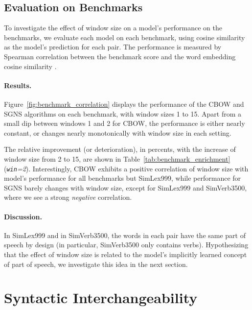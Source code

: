 \documentclass[11pt,a4paper]{article}
\begin{document}
    \subsection{Evaluation on Benchmarks}\label{sec:eval_exp}
    
    To investigate the effect of window size on a model's performance on the benchmarks,
    we evaluate each model on each benchmark, using cosine similarity
    as the model's prediction for each pair.
    The performance is measured by Spearman correlation between the benchmark score
    and the word embedding cosine similarity \cite{levy2015improving}.
    
    \paragraph{Results.}
    
    Figure~\ref{fig:benchmark_correlation} displays the performance of the CBOW and SGNS
    algorithms on each benchmark, with window sizes 1 to 15.
    Apart from a small dip between windows 1 and 2 for
    CBOW,
    the performance is either nearly constant,
    or changes nearly monotonically with window size in each setting.
    
    The relative improvement (or deterioration),
    in percents, with the increase of window size from 2 to 15,
    are shown in Table~\ref{tab:benchmark_enrichment} (\textit{\Delta \texttt{win}=2}).
    Interestingly, CBOW exhibits a positive correlation of window size with model's performance
    for all benchmarks but SimLex999,
    while performance for SGNS barely changes with window size,
    except for SimLex999 and SimVerb3500, where we see a strong \textit{negative} correlation.
    
    \paragraph{Discussion.}
    
    In SimLex999 and in SimVerb3500, the words in each pair have the same part of speech by design
    (in particular, SimVerb3500 only contains verbs).
    Hypothesizing that the effect of window size is related to the model's
    implicitly learned concept of part of speech, we investigate this idea in the next section.
    
    
    \section{Syntactic Interchangeability}\label{sec:interchangeability}
    
\end{document}
